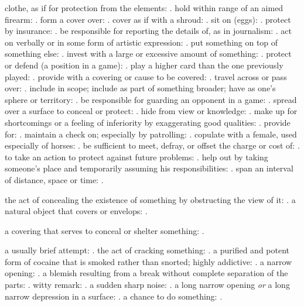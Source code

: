   clothe, as if for protection from the elements: . hold within range of an aimed firearm: . form a cover over: . cover as if with a shroud: . sit on (eggs): . protect by insurance: . be responsible for reporting the details of, as in journalism: . act on verbally or in some form of artistic expression: . put something on top of something else: . invest with a large or excessive amount of something: . protect or defend (a position in a game): . play a higher card than the one previously played: . provide with a covering or cause to be covered: . travel across or pass over: . include in scope; include as part of something broader; have as one's sphere or territory: . be responsible for guarding an opponent in a game: . spread over a surface to conceal or protect: . hide from view or knowledge: . make up for shortcomings or a feeling of inferiority by exaggerating good qualities: . provide for: . maintain a check on; especially by patrolling: . copulate with a female, used especially of horses: . be sufficient to meet, defray, or offset the charge or cost of: . to take an action to protect against future problems: . help out by taking someone's place and temporarily assuming his responsibilities: . span an interval of distance, space or time: .

  the act of concealing the existence of something by obstructing the view of it: . a natural object that covers or envelops: .

  a covering that serves to conceal or shelter something: .

  a usually brief attempt: . the act of cracking something: . a purified and potent form of cocaine that is smoked rather than snorted; highly addictive: . a narrow opening: . a blemish resulting from a break without complete separation of the parts: . witty remark: . a sudden sharp noise: . a long narrow opening \textit{or} a long narrow depression in a surface: . a chance to do something: .

